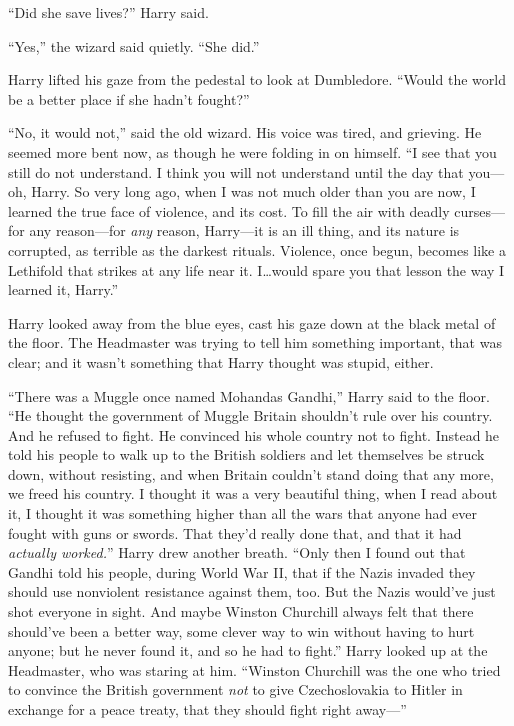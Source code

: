 “Did she save lives?” Harry said.

“Yes,” the wizard said quietly. “She did.”

Harry lifted his gaze from the pedestal to look at Dumbledore. “Would the world
be a better place if she hadn’t fought?”

“No, it would not,” said the old wizard. His voice was tired, and grieving. He
seemed more bent now, as though he were folding in on himself. “I see that you
still do not understand. I think you will not understand until the day that
you—oh, Harry. So very long ago, when I was not much older than you are now,
I learned the true face of violence, and its cost. To fill the air with deadly
curses—for any reason—for \emph{any} reason, Harry—it is an ill thing,
and its nature is corrupted, as terrible as the darkest rituals. Violence, once
begun, becomes like a Lethifold that strikes at any life near it. I…would
spare you that lesson the way I learned it, Harry.”

Harry looked away from the blue eyes, cast his gaze down at the black metal of
the floor. The Headmaster was trying to tell him something important, that was
clear; and it wasn’t something that Harry thought was stupid, either.

“There was a Muggle once named Mohandas Gandhi,” Harry said to the floor. “He
thought the government of Muggle Britain shouldn’t rule over his country. And
he refused to fight. He convinced his whole country not to fight. Instead he
told his people to walk up to the British soldiers and let themselves be struck
down, without resisting, and when Britain couldn’t stand doing that any more,
we freed his country. I thought it was a very beautiful thing, when I read
about it, I thought it was something higher than all the wars that anyone had
ever fought with guns or swords. That they’d really done that, and that it had
\emph{actually worked.}” Harry drew another breath. “Only then I found out that
Gandhi told his people, during World War II, that if the Nazis invaded they
should use nonviolent resistance against them, too. But the Nazis would’ve just
shot everyone in sight. And maybe Winston Churchill always felt that there
should’ve been a better way, some clever way to win without having to hurt
anyone; but he never found it, and so he had to fight.” Harry looked up at the
Headmaster, who was staring at him. “Winston Churchill was the one who tried to
convince the British government \emph{not} to give Czechoslovakia to Hitler in
exchange for a peace treaty, that they should fight right away—”


